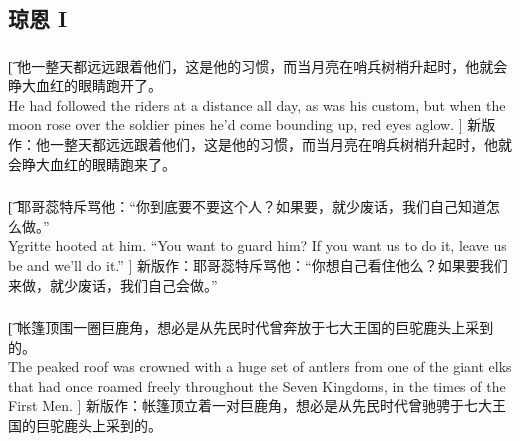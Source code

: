 \documentclass[12pt,a4paper]{article}
\begin{document}
\subsection{琼恩 I}
\subsubsection{}\t[
	他一整天都远远跟着他们，这是他的习惯，而当月亮在哨兵树梢升起时，他就会睁大血红的眼睛跑开了。\\
	He had followed the riders at a distance all day, as was his custom, but when the moon rose over the soldier pines he'd come bounding up, red eyes aglow. ]
	新版作：他一整天都远远跟着他们，这是他的习惯，而当月亮在哨兵树梢升起时，他就会睁大血红的眼睛跑来了。
	
\subsubsection{}\t[
	耶哥蕊特斥骂他：“你到底要不要这个人？如果要，就少废话，我们自己知道怎么做。” \\
	Ygritte hooted at him. “You want to guard him? If you want us to do it, leave us be and we'll do it.” ]
	新版作：耶哥蕊特斥骂他：“你想自己看住他么？如果要我们来做，就少废话，我们自己会做。”
	
\subsubsection{}\t[
	帐篷顶围一圈巨鹿角，想必是从先民时代曾奔放于七大王国的巨驼鹿头上采到的。\\
	The peaked roof was crowned with a huge set of antlers from one of the giant elks that had once roamed freely throughout the Seven Kingdoms, in the times of the First Men. ]
	新版作：帐篷顶立着一对巨鹿角，想必是从先民时代曾驰骋于七大王国的巨驼鹿头上采到的。
	
\end{document}
